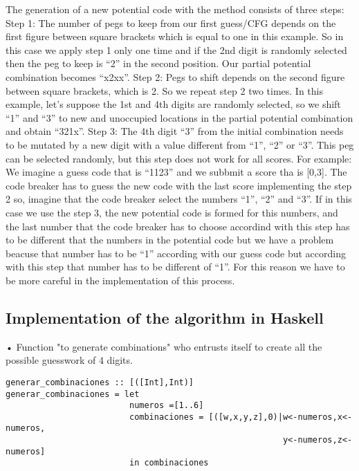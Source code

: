 \documentclass[12pt,letterpaper]{article}
\begin{document}
\begin{raggedleft}
The  generation  of  a  new  potential  code  with  the
method consists of three steps:\newline\newline
Step 1: The number of pegs to keep from our first
guess/CFG depends on the first figure between square
brackets which is equal to one in this example. So in
this case we apply step 1 only one time and if the 2nd
digit is randomly selected then the peg to keep is “2”
in   the   second   position.   Our   partial   potential
combination becomes “x2xx”.\newline\newline
Step 2: Pegs to shift depends on the second figure
between square brackets, which is 2. So we repeat
step 2 two times. In this example, let’s suppose the
1st and 4th digits are randomly selected, so we shift
“1” and “3” to new and unoccupied locations in the
partial potential combination and obtain “321x”.\newline\newline
Step 3: The 4th digit “3” from the initial combination
needs  to  be  mutated  by  a  new  digit  with  a  value
different  from  “1”,  “2”  or  “3”.  This  peg  can  be
selected randomly, but this step does not work for all scores. For example:\newline\newline
We imagine a guess code that is “1123”  and we subbmit a score tha is [0,3]. The code breaker has to guess the new code with the last  score implementing the step 2 so, imagine that the code breaker select the numbers “1”,  “2”  and  “3”.
If in this case we use the step 3, the new potential code is formed for this numbers, and the last number that the code breaker has to choose accordind with this step has to be different that the numbers in the potential code but we have a problem beacuse
that number has to be “1” according with our guess  code but according with this step that number has to be different of  “1”. For this reason we have to be more careful in the implementation of this process.
\end{raggedleft}

\newpage
\subsection{Implementation of the algorithm in Haskell}
\begin{raggedleft}
• Function "to generate combinations" who entrusts itself to create all the possible guesswork of 4 digits.
\end{raggedleft}
\begin{verbatim}
generar_combinaciones :: [([Int],Int)]
generar_combinaciones = let
                         numeros =[1..6]
                         combinaciones = [([w,x,y,z],0)|w<-numeros,x<-numeros,
                                                        y<-numeros,z<-numeros]
                         in combinaciones
\end{verbatim}
\end{document}
